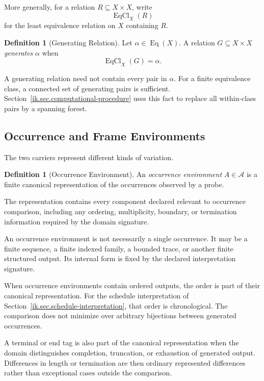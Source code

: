 \documentclass[11pt]{article}
\theoremstyle{plain}
\theoremstyle{definition}
\newtheorem{definition}[theorem]{Definition}
\theoremstyle{remark}
\begin{document}
More generally,
for a relation \(R\subseteq X\times X\),
write
\[
  \operatorname{EqCl}_X(R)
\]
for the least equivalence relation on \(X\)
containing \(R\).

\begin{definition}[Generating Relation]
  \label{ik.def.generating}
  Let \(\alpha\in\operatorname{Eq}(X)\).
  A relation \(G\subseteq X\times X\)
  \emph{generates} \(\alpha\) when
  \[
    \operatorname{EqCl}_X(G)
    =
    \alpha.
  \]
\end{definition}

A generating relation need not contain every pair in \(\alpha\).
For a finite equivalence class,
a connected set of generating pairs is sufficient.
Section~\ref{ik.sec.computational-procedure}
uses this fact to replace all within-class pairs
by a spanning forest.

\subsection{Occurrence and Frame Environments}

The two carriers represent different kinds of variation.

\begin{definition}[Occurrence Environment]
  \label{ik.def.occurrence-environment}
  An \emph{occurrence environment}
  \(A\in\mathcal{A}\)
  is a finite canonical representation
  of the occurrences observed by a probe.

  The representation contains every component
  declared relevant to occurrence comparison,
  including any ordering,
  multiplicity,
  boundary,
  or termination information
  required by the domain signature.
\end{definition}

An occurrence environment is not necessarily a single occurrence.
It may be a finite sequence,
a finite indexed family,
a bounded trace,
or another finite structured output.
Its internal form is fixed by the declared interpretation signature.

When occurrence environments contain ordered outputs,
the order is part of their canonical representation.
For the schedule interpretation of Section~\ref{ik.sec.schedule-interpretation},
that order is chronological.
The comparison does not minimize over arbitrary bijections
between generated occurrences.

A terminal or end tag is also part of the canonical representation
when the domain distinguishes completion,
truncation,
or exhaustion of generated output.
Differences in length or termination are then ordinary represented differences
rather than exceptional cases outside the comparison.
\end{document}
